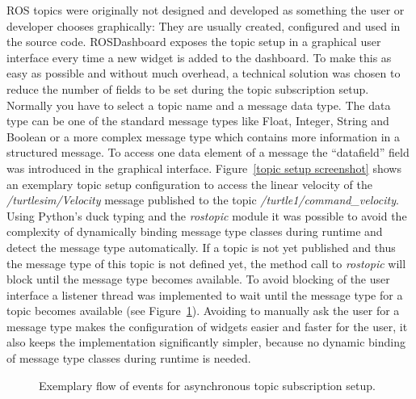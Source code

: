 ROS topics were originally not designed and developed as something the user or developer chooses graphically: They are usually created, configured and used in the source code. ROSDashboard exposes the topic setup in a graphical user interface every time a new widget is added to the dashboard. To make this as easy as possible and without much overhead, a technical solution was chosen to reduce the number of fields to be set during the topic subscription setup. Normally you have to select a topic name and a message data type. The data type can be one of the standard message types like Float, Integer, String and Boolean or a more complex message type which contains more information in a structured message. To access one data element of a message the ``datafield'' field was introduced in the graphical interface. Figure~\ref{topic setup screenshot} shows an exemplary topic setup configuration to access the linear velocity of the \emph{/turtlesim/Velocity} message published to the topic \emph{/turtle1/command\_velocity}. Using Python's duck typing and the \emph{rostopic} module it was possible to avoid the complexity of dynamically binding message type classes during runtime and detect the message type automatically. If a topic is not yet published and thus the message type of this topic is not defined yet, the method call to \emph{rostopic} will block until the message type becomes available. To avoid blocking of the user interface a listener thread was implemented to wait until the message type for a topic becomes available (see Figure~\ref{topic subscription}). Avoiding to manually ask the user for a message type makes the configuration of widgets easier and faster for the user, it also keeps the implementation significantly simpler, because no dynamic binding of message type classes during runtime is needed.

\begin{figure}[thpb]
  \centering
  \caption{Exemplary flow of events for asynchronous topic subscription setup.}
  \label{topic subscription}
\end{figure}

